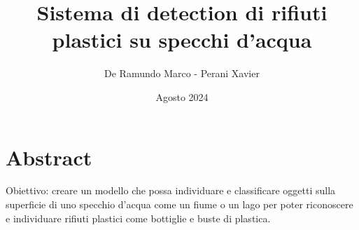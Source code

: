 \documentclass[12pt]{article}
\title{Sistema di detection di rifiuti plastici su specchi d'acqua}
\author{De Ramundo Marco - Perani Xavier}
\date{Agosto 2024}
\begin{document}
\maketitle
\section*{Abstract}
Obiettivo: creare un modello che possa individuare e classificare oggetti sulla superficie di uno specchio d'acqua come un fiume o un lago per poter riconoscere e individuare rifiuti plastici come bottiglie e buste di plastica.
\end{document}
